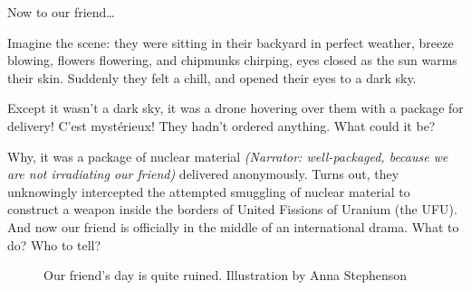 {Now to our friend\ldots

\begin{shadequote} 

  Imagine the scene: they were sitting in their backyard in perfect weather,
  breeze blowing, flowers flowering, and chipmunks chirping, eyes closed as the
  sun warms their skin. Suddenly they felt a chill, and opened their eyes to a
  dark sky.
  
  Except it wasn't a dark sky, it was a drone hovering over them with a package
  for delivery! C'est myst\'{e}rieux! They hadn't ordered anything. What could it 
  be? 
  
  Why, it was a package of nuclear material \textit{(Narrator: well-packaged,
  because we are not irradiating our friend)} delivered anonymously. Turns out,
  they unknowingly intercepted the attempted smuggling of nuclear material to
  construct a weapon inside the borders of United Fissions of Uranium (the
  UFU). And now our friend is officially in the middle of an international
  drama. What to do? Who to tell? 

\end{shadequote}

\begin{figure}[!htb]
  \centering
  \large Our friend's day is quite ruined. \small Illustration by Anna Stephenson
\end{figure}

}
